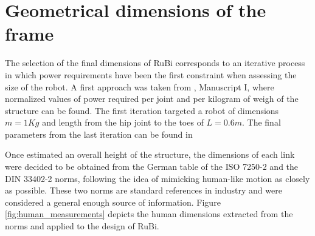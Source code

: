 
\section{Geometrical dimensions of the frame} %
\label{sec:dimensions}

The selection of the final dimensions of RuBi corresponds to an iterative process in which power requirements have been the first constraint when assessing the size of the robot.
A first approach was taken from \cite{grimmer}, Manuscript I, where normalized values of power required per joint and per kilogram of weigh of the structure can be found.
The first iteration targeted a robot of dimensions $m = 1Kg$ and length from the hip joint to the toes of $L = 0.6 m$.
The final parameters from the last iteration can be found in %

Once estimated an overall height of the structure, the dimensions of each link were decided to be obtained from the German table of the ISO 7250-2 \cite{iso_measurements} and the DIN 33402-2 \cite{din_measurements1} norms, following the idea of mimicking human-like motion as closely as possible.
These two norms are standard references in industry and were considered a general enough source of information.
Figure \ref{fig:human_measurements} depicts the human dimensions extracted from the norms and applied to the design of RuBi.


